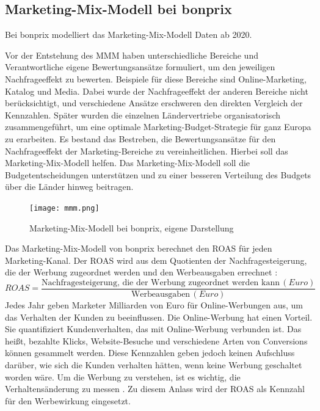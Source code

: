 \subsection{Marketing-Mix-Modell bei bonprix} 
\label{Marketing-Mix-ModellBeiBonprix}
Bei bonprix modelliert das Marketing-Mix-Modell Daten ab 2020. \par
Vor der Entstehung des \ac{MMM} haben unterschiedliche Bereiche und Verantwortliche eigene Bewertungsansätze formuliert, um den jeweiligen Nachfrageeffekt zu bewerten. Beispiele für diese Bereiche sind Online-Marketing, Katalog und Media. Dabei wurde der Nachfrageeffekt der anderen Bereiche nicht berücksichtigt, und verschiedene Ansätze erschweren den direkten Vergleich der Kennzahlen. Später wurden die einzelnen Ländervertriebe organisatorisch zusammengeführt, um eine optimale Marketing-Budget-Strategie für ganz Europa zu erarbeiten. Es bestand das Bestreben, die Bewertungsansätze für den Nachfrageeffekt der Marketing-Bereiche zu vereinheitlichen. Hierbei soll das Marketing-Mix-Modell helfen. Das Marketing-Mix-Modell soll die Budgetentscheidungen unterstützen und zu einer besseren Verteilung des Budgets über die Länder hinweg beitragen.\par
\begin{figure}[H]
    \centering
    \texttt{[image: mmm.png]}
    \caption{Marketing-Mix-Modell bei bonprix, eigene Darstellung}
    \label{fig:mmmbonprix}
\end{figure}
\noindent
Das Marketing-Mix-Modell von bonprix berechnet den \ac{ROAS} für jeden Marketing-Kanal. Der \ac{ROAS} wird aus dem Quotienten der Nachfragesteigerung, die der Werbung zugeordnet werden und den Werbeausgaben errechnet \cite[2]{roas}:
\begin{equation}
ROAS = \frac{\text{Nachfragesteigerung, die der Werbung zugeordnet werden kann} \, (Euro)}{\text{Werbeausgaben} \, (Euro)}
\end{equation}
Jedes Jahr geben Marketer Milliarden von Euro für Online-Werbungen aus, um das Verhalten der Kunden zu beeinflussen. Die Online-Werbung hat einen Vorteil. Sie quantifiziert Kundenverhalten, das mit Online-Werbung verbunden ist. Das heißt, bezahlte Klicks, Website-Besuche und verschiedene Arten von Conversions können gesammelt werden. Diese Kennzahlen geben jedoch keinen Aufschluss darüber, wie sich die Kunden verhalten hätten, wenn keine Werbung geschaltet worden wäre. Um die Werbung zu verstehen, ist es wichtig, die Verhaltensänderung zu messen \cite[1]{roas}. Zu diesem Anlass wird der \ac{ROAS} als Kennzahl für den Werbewirkung eingesetzt. \par
